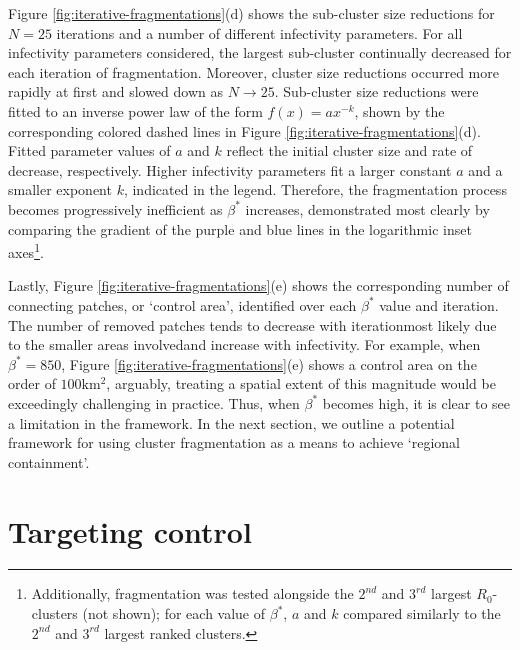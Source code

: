 Figure \ref{fig:iterative-fragmentations}(d) shows the sub-cluster size reductions for $N=25$ iterations and a number of different infectivity parameters.
For all infectivity parameters considered, the largest sub-cluster continually decreased for each iteration of fragmentation.
Moreover, cluster size reductions occurred more rapidly at first and slowed down as $N\rightarrow 25$.
Sub-cluster size reductions were fitted to an inverse power law of the form $f(x) = ax^{-k}$, shown by the corresponding colored dashed lines in Figure \ref{fig:iterative-fragmentations}(d).
Fitted parameter values of $a$ and $k$ reflect the initial cluster size and rate of decrease, respectively. 
Higher infectivity parameters fit a larger constant $a$ and a smaller exponent $k$, indicated in the legend.
Therefore, the fragmentation process becomes progressively inefficient as $\beta^*$ increases,
demonstrated most clearly by comparing the gradient of the purple and blue lines in the logarithmic inset axes\footnote{
Additionally, fragmentation was tested alongside the $2^{nd}$ and $3^{rd}$ largest $R_0$-clusters (not shown); 
for each value of $\beta^*$, $a$ and $k$ compared similarly to the $2^{nd}$ and $3^{rd}$ largest ranked clusters.}.

Lastly, Figure \ref{fig:iterative-fragmentations}(e) shows the corresponding number of connecting patches, or `control area', identified over each $\beta^*$ value and iteration.
The number of removed patches tends to decrease with iteration\textemdash most likely due to the smaller areas involved\textemdash and increase with infectivity.
For example, when $\beta^*=850$, Figure \ref{fig:iterative-fragmentations}(e) shows a control area on the order of $100\mathrm{km^2}$,
arguably, treating a spatial extent of this magnitude would be exceedingly challenging in practice.
Thus, when $\beta^*$ becomes high, it is clear to see a limitation in the framework.
In the next section, we outline a potential framework for using cluster fragmentation as a means to achieve `regional containment'.

\section{Targeting control}
\label{sec:towards-regional-control}

